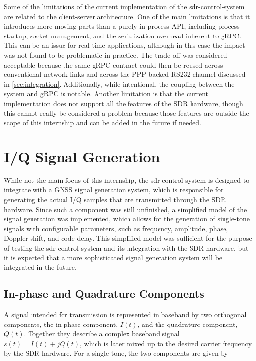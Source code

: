 Some of the limitations of the current implementation of the
\gls{sdr-control-system} are related to the client-server architecture. One of
the main limitations is that it introduces more moving parts than a purely
in-process API, including process startup, socket management, and the
serialization overhead inherent to \gls{gRPC}. This can be an issue for
real-time applications, although in this case the impact was not found to be
problematic in practice. The trade-off was considered acceptable because the
same gRPC contract could then be reused across conventional network links and
across the \gls{PPP}-backed \gls{RS232} channel discussed in
\autoref{sec:integration}. Additionally, while intentional, the coupling
between the system and \gls{gRPC} is notable. Another limitation is that the
current implementation does not support all the features of the \gls{SDR}
hardware, though this cannot really be considered a problem because those
features are outside the scope of this internship and can be added in the
future if needed.

\section{\gls{I/Q} Signal Generation}
\label{sec:iq-signal-generation}

While not the main focus of this internship, the \gls{sdr-control-system} is
designed to integrate with a \gls{GNSS} signal generation system, which is
responsible for generating the actual \gls{I/Q} samples that are transmitted
through the \gls{SDR} hardware. Since such a component was still unfinished, a
simplified model of the signal generation was implemented, which allows for the
generation of single-tone signals with configurable parameters, such as
frequency, amplitude, phase, Doppler shift, and code delay. This simplified
model was sufficient for the purpose of testing the \gls{sdr-control-system}
and its integration with the \gls{SDR} hardware, but it is expected that a more
sophisticated signal generation system will be integrated in the future.

\subsection{In-phase and Quadrature Components}

A signal intended for transmission is represented in baseband by two orthogonal
components, the in-phase component, $I(t)$, and the quadrature component,
$Q(t)$. Together they describe a complex baseband signal $s(t) = I(t) + jQ(t)$,
which is later mixed up to the desired carrier frequency by the \gls{SDR}
hardware. For a single tone, the two components are given by

